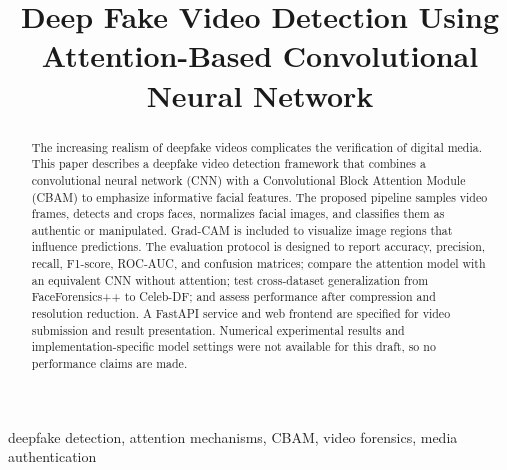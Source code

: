 \documentclass[conference]{IEEEtran}
\begin{document}
\title{Deep Fake Video Detection Using Attention-Based Convolutional Neural Network}

\author{
\and
{}
\and
{}
\and
{}
}

\maketitle

\begin{abstract}
The increasing realism of deepfake videos complicates the verification of digital media. This paper describes a deepfake video detection framework that combines a convolutional neural network (CNN) with a Convolutional Block Attention Module (CBAM) to emphasize informative facial features. The proposed pipeline samples video frames, detects and crops faces, normalizes facial images, and classifies them as authentic or manipulated. Grad-CAM is included to visualize image regions that influence predictions. The evaluation protocol is designed to report accuracy, precision, recall, F1-score, ROC-AUC, and confusion matrices; compare the attention model with an equivalent CNN without attention; test cross-dataset generalization from FaceForensics++ to Celeb-DF; and assess performance after compression and resolution reduction. A FastAPI service and web frontend are specified for video submission and result presentation. Numerical experimental results and implementation-specific model settings were not available for this draft, so no performance claims are made.
\end{abstract}

\begin{IEEEkeywords}
deepfake detection, attention mechanisms, CBAM, video forensics, media authentication
\end{IEEEkeywords}










\end{document}

